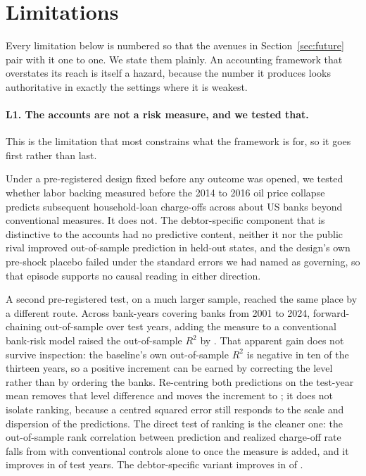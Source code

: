 \section{Limitations}
\label{sec:limitations}

Every limitation below is numbered so that the avenues in Section~\ref{sec:future} pair with it
one to one. We state them plainly. An accounting framework that overstates its reach is itself a
hazard, because the number it produces looks authoritative in exactly the settings where it is
weakest.

\paragraph{L1. The accounts are not a risk measure, and we tested that.} This is the limitation
that most constrains what the framework is for, so it goes first rather than last.

Under a pre-registered design fixed before any outcome was opened, we tested whether labor
backing measured before the 2014 to 2016 oil price collapse predicts subsequent household-loan
charge-offs across about  US banks beyond conventional measures. It does not. The
debtor-specific component that is distinctive to the accounts had no predictive content, neither
it nor the public rival improved out-of-sample prediction in held-out states, and the design's
own pre-shock placebo failed under the standard errors we had named as governing, so that episode
supports no causal reading in either direction.

A second pre-registered test, on a much larger sample, reached the same place by a different
route. Across  bank-years covering  banks from 2001
to 2024, forward-chaining out-of-sample over  test years, adding the
measure to a conventional bank-risk model raised the out-of-sample $R^2$ by
. That apparent gain does not survive inspection: the baseline's own
out-of-sample $R^2$ is negative in ten of the thirteen years, so a positive increment can be
earned by correcting the level rather than by ordering the banks. Re-centring both predictions on
the test-year mean removes that level difference and moves the increment to
; it does not isolate ranking, because a centred squared error still
responds to the scale and dispersion of the predictions. The direct test of ranking is the
cleaner one: the
out-of-sample rank correlation between prediction and realized charge-off rate falls from
 with conventional controls alone to  once the
measure is added, and it improves in  of  test
years. The debtor-specific variant improves in  of
.

